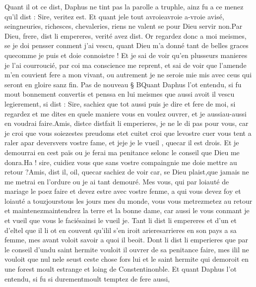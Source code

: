 \documentclass{article}
\begin{document}
\begin{pages}
   Quant il ot ce dist, Daphus ne tint pas la parolle a truphle, ainz fu a ce menez qu’il dist :
   Sire, veritez est. Et quant jele 
      tout avroieavroie a-vroie
      avisé, seingneuries, richesces, chevaleries, riens ne valent se pour Dieu servir non.Par Dieu, frere, dist li empereres, verité avez dist. 
   Or regardez donc a moi meismes, se je doi pensser conment j’ai vescu, 
   quant Dieu m’a donné tant de belles graces 
      quecomme je puis et doie connoistre ! 
   Et je sai de voir qu’en plusseurs manieres je l’ai courroucié, par coi ma conscience me reprent, 
   et sai de voir que l’amende m’en couvient fere a mon vivant, 
   ou autrement je ne seroie mie mis avec ceus qui seront en gloire sanz fin. \pend
\pstart Pas de nouveau § BQuant Daphus l’ot entendu, 
   si fu mout bonnement convertis et penssa en lui meismes que 
   aussi avoit il vescu legierement, si dist :
   Sire, sachiez que tot aussi puis je dire et fere de moi, si regardez et me dites en quele maniere 
      vous en voulez ouvrer, et je aussiau-aussi 
      en voudrai faire.Amis, distce distfait 
      li emperieres, je ne le di pas pour vous, 
      car je croi que vous soiezestes preudoms 
      etet cuitet croi 
      que levostre cuer vous tent 
      a raler apar deversvers 
      vostre fame, et jeje je 
      le vueil
      , quecar il est drois. 
      Et je demourrai en cest païs ou je ferai ma penitance selonc le conseil que Dieu me donra.Ha ! sire, cuidiez vous que sans vostre compaingnie me doie mettre au retour ?Amis, dist il, oil, 
      quecar sachiez de voir 
      car, se Dieu plaist,que jamais ne me metrai 
   en l’ordure ou je ai tant demouré. Mes vous, qui par loiauté de mariage le poez faire 
   et devez estre avec vostre fenme, 
      a qui vous devez foy et loiauté a 
         touzjourstous les jours
         mes du monde, 
      vous vous metrezmetez au retour et 
      maintenezmaintendrez la terre et la bonne dame, 
      car aussi le vous conmant je et vueil que vous le faciésainsi le vueil je.
   Tant li dist li empereres et d’un et 
   d’eltel que il li ot en couvent 
   qu’ilil s'en iroit 
   arieresarrieres en son pays a sa femme, 
   mes avant voloit savoir a quoi il beoit. Dont li dist li emperieres que 
   par le conseil d’undu 
      saint hermite vouloit
      il ouvrer de sa penitance faire, 
      mes ilil ne vouloit que nul 
      nele seust 
      ceste chose fors lui 
      et le saint hermite 
      qui demoroit en une forest moult estrange et loing de 
      Constentinonble.
   Et quant Daphus l’ot entendu, si fu si 
   durementmoult temptez de fere aussi, 

\end{pages}
\end{document}

